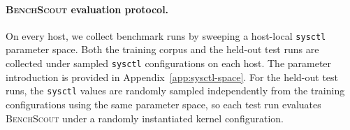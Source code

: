 \documentclass[sigplan,10pt]{acmart}
\newcommand{\ourmethod}{\textsc{BenchScout}\xspace}
\newcommand{\ptscpu}{PTS-CPU}
\newcommand{\ptsgpu}{PTS-GPU}
\newcommand{\appname}{BenchScout}
\begin{document}
\paragraph{\ourmethod{} evaluation protocol.}
On every host, we collect benchmark runs by sweeping a host-local \texttt{sysctl} parameter space.
Both the training corpus and the held-out test runs are collected under sampled \texttt{sysctl} configurations on each host.
The parameter introduction is provided in Appendix~\ref{app:sysctl-space}.
For the held-out test runs, the \texttt{sysctl} values are randomly sampled independently from the training configurations using the same parameter space, so each test run evaluates \ourmethod{} under a randomly instantiated kernel configuration.





\end{document}
